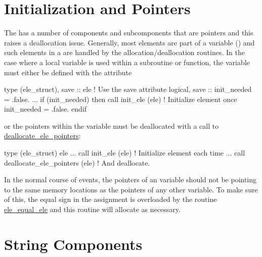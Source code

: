 \section{Initialization and Pointers}

The  has a number of components and subcomponents 
that are pointers and this raises a deallocation issue.
Generally, most  elements are part of a 
variable ()
and such elements in a  are handled by the
 allocation/deallocation routines. 
In the case where a local 
variable is used within a subroutine or function, the  
variable must either be defined with the  attribute 
\begin{example}
  type (ele_struct), save :: ele          ! Use the save attribute
  logical, save :: init_needed = .false.
  ...
  if (init_needed) then
    call init_ele (ele)                ! Initialize element once
    init_needed = .false.
  endif
\end{example}
or the pointers within the variable must be deallocated  with a call to
\hyperref[r:deallocate.ele.pointers]{deallocate_ele_pointers}:
\begin{example}
  type (ele_struct) ele  
  ...
  call init_ele (ele)                ! Initialize element each time
  ...
  call deallocate_ele_pointers (ele) ! And deallocate.
\end{example}

In the normal course of events, the pointers of an  variable
should not be pointing to the same memory locations as the pointers
of any other  variable. To make sure of this,
the equal sign in the assignment 
is overloaded by the routine \hyperref[r:ele.equal.ele]{ele_equal_ele}
and this routine will allocate as necessary.

\section{String Components}
\label{s:ele.string}

